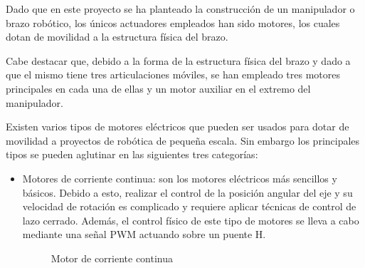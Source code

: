 Dado que en este proyecto se ha planteado la construcción de un manipulador o brazo robótico, los únicos actuadores empleados han sido motores, los cuales dotan de movilidad a la estructura física del brazo.

Cabe destacar que, debido a la forma de la estructura física del brazo y dado a que el mismo tiene tres articulaciones móviles, se han empleado tres motores principales en cada una de ellas y un motor auxiliar en el extremo del manipulador.

Existen varios tipos de motores eléctricos que pueden ser usados para dotar de movilidad a proyectos de robótica de pequeña escala. Sin embargo los principales tipos se pueden aglutinar en las siguientes tres categorías:

\begin{itemize}
    \item Motores de corriente continua: son los motores eléctricos más sencillos y básicos. Debido a esto, realizar el control de la posición angular del eje y su velocidad de rotación es complicado y requiere aplicar técnicas de control de lazo cerrado. Además, el control físico de este tipo de motores se lleva a cabo mediante una señal \ac{PWM} actuando sobre un puente H.
 
    \begin{figure}[htbp]
    \centering
    \caption{Motor de corriente continua} \label{fig:lego}
    \end{figure}



\end{itemize}
